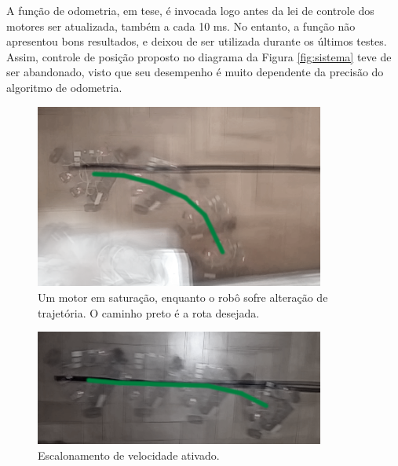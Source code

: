 A função de odometria, em tese, é invocada logo antes da lei de controle dos motores ser atualizada, também a cada 10 ms. No entanto, a função não apresentou bons resultados, e deixou de ser utilizada durante os últimos testes. Assim, controle de posição proposto no diagrama da Figura \ref{fig:sistema} teve de ser abandonado, visto que seu desempenho é muito dependente da precisão do algoritmo de odometria.

\begin{figure}[ht!]
  \centering
  \includegraphics[width = 0.85\textwidth]{imagens/scaling_off}
  \caption{Um motor em saturação, enquanto o robô sofre alteração de trajetória. O caminho preto é a rota desejada.}
  \label{fig:scaling_off}
\end{figure}

\begin{figure}[h!]
  \centering
  \includegraphics[width = 0.85\textwidth]{imagens/scaling_on}
  \caption{Escalonamento de velocidade ativado.}
  \label{fig:scaling_on}
\end{figure}
